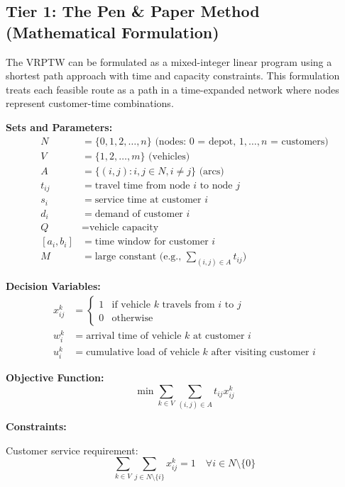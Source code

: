 \documentclass{article}
\begin{document}
\subsection{Tier 1: The Pen \& Paper Method (Mathematical Formulation)}

The VRPTW can be formulated as a mixed-integer linear program using a shortest path approach with time and capacity constraints. This formulation treats each feasible route as a path in a time-expanded network where nodes represent customer-time combinations.

\textbf{Sets and Parameters:}
\begin{align}
N &= \{0, 1, 2, \ldots, n\} \text{ (nodes: 0 = depot, } 1, \ldots, n \text{ = customers)} \\
V &= \{1, 2, \ldots, m\} \text{ (vehicles)} \\
A &= \{(i,j) : i, j \in N, i \neq j\} \text{ (arcs)} \\
t_{ij} &= \text{travel time from node } i \text{ to node } j \\
s_i &= \text{service time at customer } i \\
d_i &= \text{demand of customer } i \\
Q &= \text{vehicle capacity} \\
[a_i, b_i] &= \text{time window for customer } i \\
M &= \text{large constant (e.g., } \sum_{(i,j) \in A} t_{ij} \text{)}
\end{align}

\textbf{Decision Variables:}
\begin{align}
x_{ij}^k &= \begin{cases} 
1 & \text{if vehicle } k \text{ travels from } i \text{ to } j \\
0 & \text{otherwise}
\end{cases} \\
w_i^k &= \text{arrival time of vehicle } k \text{ at customer } i \\
u_i^k &= \text{cumulative load of vehicle } k \text{ after visiting customer } i
\end{align}

\textbf{Objective Function:}
\begin{equation}
\min \sum_{k \in V} \sum_{(i,j) \in A} t_{ij} x_{ij}^k
\end{equation}

\textbf{Constraints:}

Customer service requirement:
\begin{equation}
\sum_{k \in V} \sum_{j \in N \setminus \{i\}} x_{ij}^k = 1 \quad \forall i \in N \setminus \{0\}
\end{equation}
\end{document}
